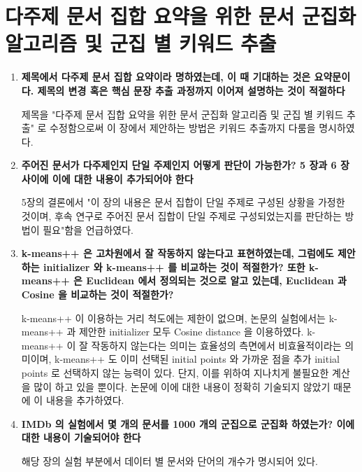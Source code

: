 \documentclass[11pt]{article}
\begin{document}
\section{다주제 문서 집합 요약을 위한 문서 군집화 알고리즘 및 군집 별
키워드 추출 }
\begin{enumerate}
\item \textbf{제목에서 다주제 문서 집합 요약이라 명하였는데, 이 때 기대하는 것은 요약문이다. 제목의 변경 혹은 핵심 문장 추출 과정까지 이어져 설명하는 것이 적절하다}

제목을 "다주제 문서 집합 요약을 위한 문서 군집화 알고리즘 및 군집 별 키워드 추출" 로 수정함으로써 이 장에서 제안하는 방법은 키워드 추출까지 다룸을 명시하였다.

\item \textbf{주어진 문서가 다주제인지 단일 주제인지 어떻게 판단이 가능한가? 5 장과 6 장 사이에 이에 대한 내용이 추가되어야 한다}

5장의 결론에서 "이 장의 내용은 문서 집합이 단일 주제로 구성된 상황을 가정한 것이며, 후속 연구로 주어진 문서 집합이 단일 주제로 구성되었는지를 판단하는 방법이 필요"함을 언급하였다.

\item \textbf{k-means++ 은 고차원에서 잘 작동하지 않는다고 표현하였는데, 그럼에도 제안하는 initializer 와 k-means++ 를 비교하는 것이 적절한가? 또한 k-means++ 은 Euclidean 에서 정의되는 것으로 알고 있는데, Euclidean 과 Cosine 을 비교하는 것이 적절한가?}

k-means++ 이 이용하는 거리 척도에는 제한이 없으며, 논문의 실험에서는 k-means++ 과 제안한 initializer  모두 Cosine distance 을 이용하였다.
k-means++ 이 잘 작동하지 않는다는 의미는 효율성의 측면에서 비효율적이라는 의미이며, k-means++ 도 이미 선택된 initial points 와 가까운 점을 추가 initial points 로 선택하지 않는 능력이 있다.
단지, 이를 위하여 지나치게 불필요한 계산을 많이 하고 있을 뿐이다.
논문에 이에 대한 내용이 정확히 기술되지 않았기 때문에 이 내용을 추가하였다.

\item \textbf{IMDb 의 실험에서 몇 개의 문서를 1000 개의 군집으로 군집화 하였는가? 이에 대한 내용이 기술되어야 한다}

해당 장의 실험 부분에서 데이터 별 문서와 단어의 개수가 명시되어 있다.

\end{enumerate}
\end{document}
